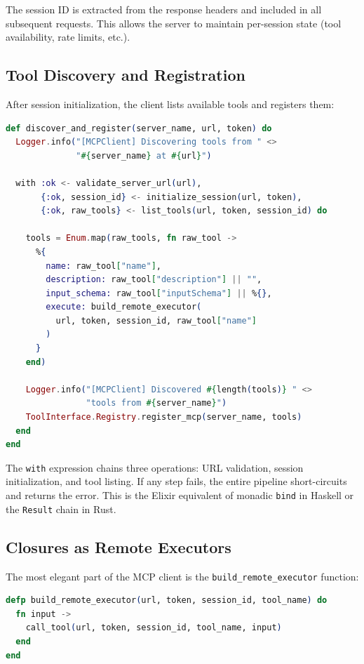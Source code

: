 \documentclass[12pt,a4paper]{article}
\theoremstyle{plain}
\theoremstyle{definition}
\begin{document}
The session ID is extracted from the response headers and included in all subsequent requests. This allows the server to maintain per-session state (tool availability, rate limits, etc.).

\subsection{Tool Discovery and Registration}

After session initialization, the client lists available tools and registers them:

\begin{lstlisting}[language=elixir, caption={MCP tool discovery and registration pipeline.}, label={lst:mcp-discover}]
def discover_and_register(server_name, url, token) do
  Logger.info("[MCPClient] Discovering tools from " <>
              "#{server_name} at #{url}")

  with :ok <- validate_server_url(url),
       {:ok, session_id} <- initialize_session(url, token),
       {:ok, raw_tools} <- list_tools(url, token, session_id) do

    tools = Enum.map(raw_tools, fn raw_tool ->
      %{
        name: raw_tool["name"],
        description: raw_tool["description"] || "",
        input_schema: raw_tool["inputSchema"] || %{},
        execute: build_remote_executor(
          url, token, session_id, raw_tool["name"]
        )
      }
    end)

    Logger.info("[MCPClient] Discovered #{length(tools)} " <>
                "tools from #{server_name}")
    ToolInterface.Registry.register_mcp(server_name, tools)
  end
end
\end{lstlisting}

The \texttt{with} expression chains three operations: URL validation, session initialization, and tool listing. If any step fails, the entire pipeline short-circuits and returns the error. This is the Elixir equivalent of monadic \texttt{bind} in Haskell or the \texttt{Result} chain in Rust.

\subsection{Closures as Remote Executors}

The most elegant part of the MCP client is the \texttt{build\_remote\_executor} function:

\begin{lstlisting}[language=elixir, caption={Closure-based remote executor construction.}, label={lst:closure}]
defp build_remote_executor(url, token, session_id, tool_name) do
  fn input ->
    call_tool(url, token, session_id, tool_name, input)
  end
end
\end{lstlisting}
\end{document}
